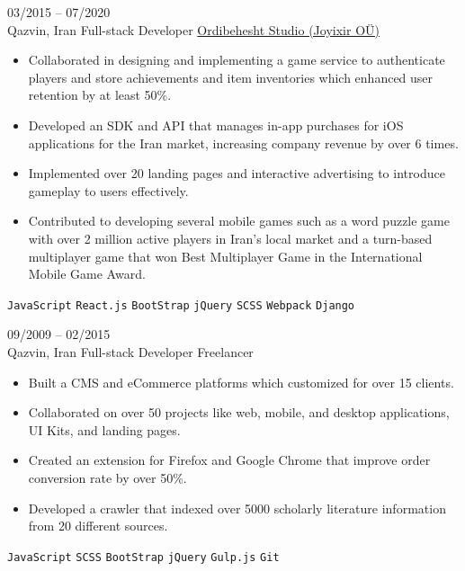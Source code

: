 \documentclass[8pt]{developercv} %
\begin{document}
\begin{entrylist}
        \entry
        {03/2015 -- 07/2020 \\ Qazvin, Iran}
        {Full-stack Developer}
        {\href{https://www.joyixir.com/}{Ordibehesht Studio  (Joyixir OÜ)}}
        {\vspace{-10pt}
            \begin{itemize}[noitemsep,topsep=0pt,parsep=0pt,partopsep=0pt, leftmargin=-1pt]
                \item Collaborated in designing and implementing a game service to authenticate players and store achievements and item inventories which enhanced user retention by at least 50\%.
                \item Developed an SDK and API that manages in-app purchases for iOS applications for the Iran market, increasing company revenue by over 6 times.
                \item Implemented over 20 landing pages and interactive advertising to introduce gameplay to users effectively.
                \item Contributed to developing several mobile games such as a word puzzle game with over 2 million active players in Iran's local market and a turn-based multiplayer game that won Best Multiplayer Game in the International Mobile Game Award.
            \end{itemize}
            \texttt{JavaScript} \slashsep \texttt{React.js} \slashsep \texttt{BootStrap} \slashsep \texttt{jQuery} \slashsep \texttt{SCSS} \slashsep \texttt{Webpack} \slashsep \texttt{Django}
        }

        \entry
        {09/2009 -- 02/2015 \\ Qazvin, Iran}
        {Full-stack Developer}
        {Freelancer}
        {\vspace{-10pt}
            \begin{itemize}[noitemsep,topsep=0pt,parsep=0pt,partopsep=0pt, leftmargin=-1pt]
                \item Built a CMS and eCommerce platforms which customized for over 15 clients.
                \item Collaborated on over 50 projects like web, mobile, and desktop applications, UI Kits, and landing pages.
                \item Created an extension for Firefox and Google Chrome that improve order conversion rate by over 50\%.
                \item Developed a crawler that indexed over 5000 scholarly literature information from 20 different sources.
            \end{itemize}
            \texttt{JavaScript} \slashsep \texttt{SCSS} \slashsep \texttt{BootStrap} \slashsep \texttt{jQuery} \slashsep \texttt{Gulp.js} \slashsep \texttt{Git}
        }
    \end{entrylist}
\end{document}
